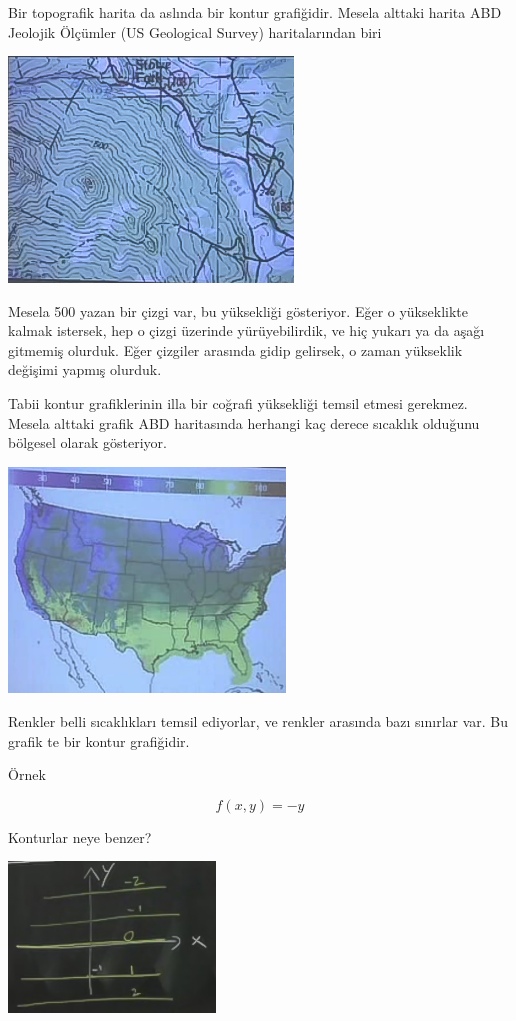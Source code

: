 \documentclass[12pt,fleqn]{article}\usepackage{../../common}
\begin{document}
Bir topografik harita da aslında bir kontur grafiğidir. Mesela alttaki harita
ABD Jeolojik Ölçümler (US Geological Survey) haritalarından biri

\begin{center}
\includegraphics[height=6cm]{8_9.png}
\end{center}

Mesela 500 yazan bir çizgi var, bu yüksekliği gösteriyor. Eğer o yükseklikte
kalmak istersek, hep o çizgi üzerinde yürüyebilirdik, ve hiç yukarı ya da aşağı
gitmemiş olurduk. Eğer çizgiler arasında gidip gelirsek, o zaman yükseklik
değişimi yapmış olurduk.

Tabii kontur grafiklerinin illa bir coğrafi yüksekliği temsil etmesi
gerekmez. Mesela alttaki grafik ABD haritasında herhangi kaç derece sıcaklık
olduğunu bölgesel olarak gösteriyor.

\begin{center}
\includegraphics[height=6cm]{8_10.png}
\end{center}

Renkler belli sıcaklıkları temsil ediyorlar, ve renkler arasında bazı sınırlar
var. Bu grafik te bir kontur grafiğidir.

Örnek

$$ f(x,y) = -y $$

Konturlar neye benzer? 

\begin{center}
\includegraphics[height=4cm]{8_11.png}
\end{center}
\end{document}
